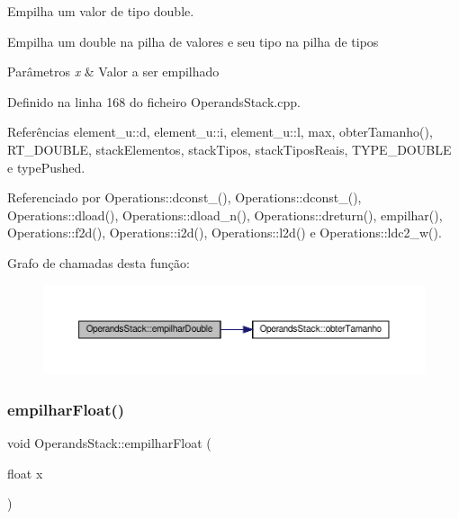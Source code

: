 Empilha um valor de tipo double. 

Empilha um double na pilha de valores e seu tipo na pilha de tipos


\begin{DoxyParams}{Parâmetros}
{\em x} & Valor a ser empilhado \\
\hline
\end{DoxyParams}


Definido na linha 168 do ficheiro Operands\+Stack.\+cpp.



Referências element\+\_\+u\+::d, element\+\_\+u\+::i, element\+\_\+u\+::l, max, obter\+Tamanho(), R\+T\+\_\+\+D\+O\+U\+B\+LE, stack\+Elementos, stack\+Tipos, stack\+Tipos\+Reais, T\+Y\+P\+E\+\_\+\+D\+O\+U\+B\+LE e type\+Pushed.



Referenciado por Operations\+::dconst\+\_(), Operations\+::dconst\+\_(), Operations\+::dload(), Operations\+::dload\+\_\+n(), Operations\+::dreturn(), empilhar(), Operations\+::f2d(), Operations\+::i2d(), Operations\+::l2d() e Operations\+::ldc2\+\_\+w().

Grafo de chamadas desta função\+:
\nopagebreak
\begin{figure}[H]
\begin{center}
\leavevmode
\includegraphics[width=350pt]{classOperandsStack_a45dde91cc54ad980d1cbb7cdb1e084cd_cgraph}
\end{center}
\end{figure}
\mbox{\label{classOperandsStack_aeed478b52748b87ac85db261332b633b}} 
\subsubsection{\texorpdfstring{empilhar\+Float()}{empilharFloat()}}
{\footnotesize\ttfamily void Operands\+Stack\+::empilhar\+Float (\begin{DoxyParamCaption}\item[{float}]{x }\end{DoxyParamCaption})}




